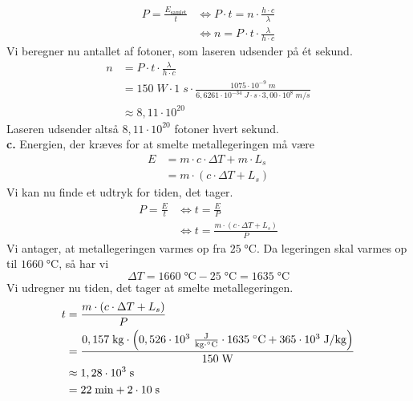 \documentclass{report}
\begin{document}
\begin{equation*}
\begin{split}
P=\frac{E _{\text{samlet} }}{t} &\iff P \cdot t = n \cdot \frac{h \cdot c}{\lambda }\\
&\iff n=P \cdot t \cdot \frac{\lambda }{h \cdot c}
\end{split}
\end{equation*}
Vi beregner nu antallet af fotoner, som laseren udsender på ét sekund.
\begin{equation*}
\begin{split}
n&=P \cdot t \cdot \frac{\lambda }{h \cdot c}\\
&=150 \;\unit{W} \cdot 1 \;\unit{s} \cdot \frac{1075 \cdot 10 ^{-9}\;\unit{m} }{6,6261 \cdot 10 ^{-34} \;\unit{J \cdot s} \cdot 3,00 \cdot 10^8 \;\unit{m/s} }\\
&\approx 8,11 \cdot 10^{20}
\end{split}
\end{equation*}
Laseren udsender altså $8,11 \cdot 10 ^{20}$ fotoner hvert sekund. \\[1ex]
\textbf{c.}
Energien, der kræves for at smelte metallegeringen må være
\begin{equation*}
\begin{split}
E&=m \cdot c \cdot \Delta T + m \cdot L_s \\
&=m \cdot \left(c \cdot \Delta T + L_s\right) 
\end{split}
\end{equation*}
Vi kan nu finde et udtryk for tiden, det tager.
\begin{equation*}
\begin{split}
P=\frac{E}{t} &\iff t=\frac{E}{P}\\
&\iff t=\frac{m \cdot \left(c \cdot \Delta T + L_s\right) }{P}
\end{split}
\end{equation*}
Vi antager, at metallegeringen varmes op fra $25 \;\unit{\celsius} $.
Da legeringen skal varmes op til $1660 \;\unit{\celsius} $, så har vi
\[
\Delta T = 1660 \;\unit{\celsius} - 25 \;\unit{\celsius} = 1635 \;\unit{\celsius} 
\] 
Vi udregner nu tiden, det tager at smelte metallegeringen.
\begin{equation*}
\begin{split}
t&=\frac{m \cdot \left(c \cdot \Delta T + L_s\right) }{P}\\
&=\frac{0,157 \;\unit{kg} \cdot \left(0,526 \cdot 10^3 \;\unit{\frac{J}{kg \cdot \celsius}} \cdot 1635 \;\unit{\celsius} + 365 \cdot 10^3\;\unit{J/kg} \right) }{150 \;\unit{W} }\\
&\approx 1,28 \cdot 10^3 \;\unit{s} \\
&=22 \;\unit{min} + 2 \cdot 10 \;\unit{s} 
\end{split}
\end{equation*}
\end{document}
